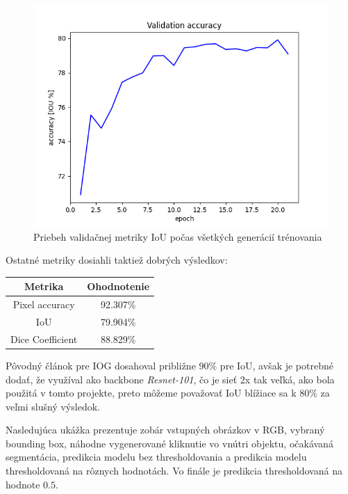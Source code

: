 \documentclass [11pt, a4paper, twocolumn]{article}
\begin{document}
\begin{figure}[H]
\centering
\includegraphics[width=\linewidth]{val_accuracy}
\caption{Priebeh validačnej metriky IoU počas všetkých generácií trénovania}
\end{figure}

Ostatné metriky dosiahli taktiež dobrých výsledkov:

\begin{center}
\begin{tabular}{|c| c|}
\hline
\textbf{Metrika} & \textbf{Ohodnotenie}\\ \hline
Pixel accuracy & 92.307\% \\ \hline
IoU & 79.904\% \\ \hline
Dice Coefficient & 88.829\% \\
\hline
\end{tabular}
\end{center}

Pôvodný článok pre IOG dosahoval približne $90\%$ pre IoU, avšak je potrebné dodať, že využíval ako backbone \textit{Resnet-101}, čo je sieť 2x tak veľká, ako bola použitá v tomto projekte, preto môžeme považovať IoU blížiace sa k $80 \%$ za veľmi slušný výsledok.

Nasledujúca ukážka prezentuje zobár vstupných obrázkov v RGB, vybraný bounding box, náhodne vygenerované kliknutie vo vnútri objektu, očakávaná segmentácia, predikcia modelu bez thresholdovania a predikcia modelu thresholdovaná na rôznych hodnotách. Vo finále je predikcia thresholdovaná na hodnote $0.5$.
\end{document}
